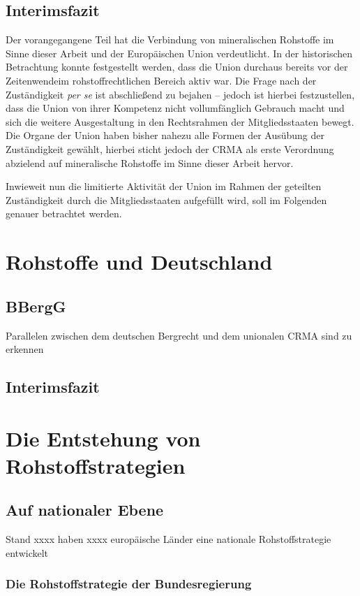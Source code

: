 \documentclass[12pt,a4paper,oneside]{book} %
\begin{document}
	\subsection{Interimsfazit}
	Der vorangegangene Teil hat die Verbindung von mineralischen Rohstoffe im Sinne dieser Arbeit und der Europäischen Union verdeutlicht. In der historischen Betrachtung konnte festgestellt werden, dass die Union durchaus bereits vor der \glqq Zeitenwende\grqq im rohstoffrechtlichen Bereich aktiv war.
	Die Frage nach der Zuständigkeit \textit{per se} ist abschließend zu bejahen -- jedoch ist hierbei festzustellen, dass die Union von ihrer Kompetenz nicht vollumfänglich Gebrauch macht und sich die weitere Ausgestaltung in den Rechtsrahmen der Mitgliedsstaaten bewegt.
	Die Organe der Union haben bisher nahezu alle Formen der Ausübung der Zuständigkeit gewählt, hierbei sticht jedoch der CRMA als erste Verordnung abzielend auf mineralische Rohstoffe im Sinne dieser Arbeit hervor.
	
	Inwieweit nun die limitierte Aktivität der Union im Rahmen der geteilten Zuständigkeit durch die Mitgliedsstaaten aufgefüllt wird, soll im Folgenden genauer betrachtet werden.
	
	\section{Rohstoffe und Deutschland}
	
	\subsection{BBergG}
	Parallelen zwischen dem deutschen Bergrecht und dem unionalen CRMA sind zu erkennen
	
	\subsection{Interimsfazit}
	
	\section{Die Entstehung von Rohstoffstrategien}
	
	\subsection{Auf nationaler Ebene}
	Stand xxxx haben xxxx europäische Länder eine nationale Rohstoffstrategie entwickelt
	
	\subsubsection{Die Rohstoffstrategie der Bundesregierung}
	
\end{document}
